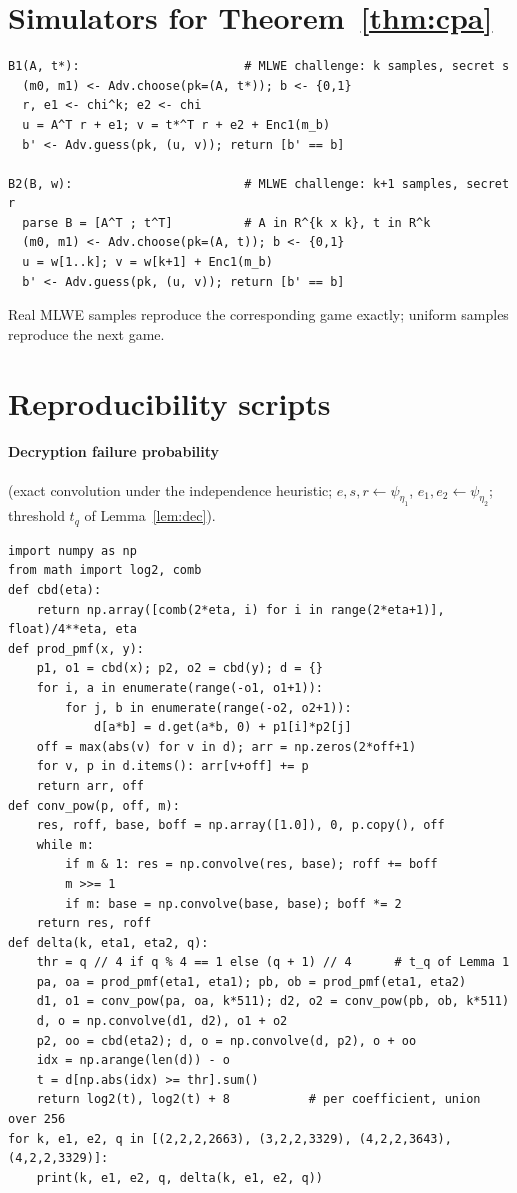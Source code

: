\documentclass[11pt]{article}
\theoremstyle{remark}
\begin{document}
\section{Simulators for Theorem~\ref{thm:cpa}}\label{app:sim}
\begin{verbatim}
B1(A, t*):                       # MLWE challenge: k samples, secret s
  (m0, m1) <- Adv.choose(pk=(A, t*)); b <- {0,1}
  r, e1 <- chi^k; e2 <- chi
  u = A^T r + e1; v = t*^T r + e2 + Enc1(m_b)
  b' <- Adv.guess(pk, (u, v)); return [b' == b]

B2(B, w):                        # MLWE challenge: k+1 samples, secret r
  parse B = [A^T ; t^T]          # A in R^{k x k}, t in R^k
  (m0, m1) <- Adv.choose(pk=(A, t)); b <- {0,1}
  u = w[1..k]; v = w[k+1] + Enc1(m_b)
  b' <- Adv.guess(pk, (u, v)); return [b' == b]
\end{verbatim}
Real MLWE samples reproduce the corresponding game exactly; uniform samples reproduce the next game.

\section{Reproducibility scripts}\label{app:script}
\paragraph{Decryption failure probability} (exact convolution under the independence heuristic; $e,s,r\leftarrow\psi_{\eta_1}$, $e_1,e_2\leftarrow\psi_{\eta_2}$; threshold $t_q$ of Lemma~\ref{lem:dec}).
\begin{verbatim}
import numpy as np
from math import log2, comb
def cbd(eta):
    return np.array([comb(2*eta, i) for i in range(2*eta+1)], float)/4**eta, eta
def prod_pmf(x, y):
    p1, o1 = cbd(x); p2, o2 = cbd(y); d = {}
    for i, a in enumerate(range(-o1, o1+1)):
        for j, b in enumerate(range(-o2, o2+1)):
            d[a*b] = d.get(a*b, 0) + p1[i]*p2[j]
    off = max(abs(v) for v in d); arr = np.zeros(2*off+1)
    for v, p in d.items(): arr[v+off] += p
    return arr, off
def conv_pow(p, off, m):
    res, roff, base, boff = np.array([1.0]), 0, p.copy(), off
    while m:
        if m & 1: res = np.convolve(res, base); roff += boff
        m >>= 1
        if m: base = np.convolve(base, base); boff *= 2
    return res, roff
def delta(k, eta1, eta2, q):
    thr = q // 4 if q % 4 == 1 else (q + 1) // 4      # t_q of Lemma 1
    pa, oa = prod_pmf(eta1, eta1); pb, ob = prod_pmf(eta1, eta2)
    d1, o1 = conv_pow(pa, oa, k*511); d2, o2 = conv_pow(pb, ob, k*511)
    d, o = np.convolve(d1, d2), o1 + o2
    p2, oo = cbd(eta2); d, o = np.convolve(d, p2), o + oo
    idx = np.arange(len(d)) - o
    t = d[np.abs(idx) >= thr].sum()
    return log2(t), log2(t) + 8           # per coefficient, union over 256
for k, e1, e2, q in [(2,2,2,2663), (3,2,2,3329), (4,2,2,3643), (4,2,2,3329)]:
    print(k, e1, e2, q, delta(k, e1, e2, q))
\end{verbatim}
\end{document}
